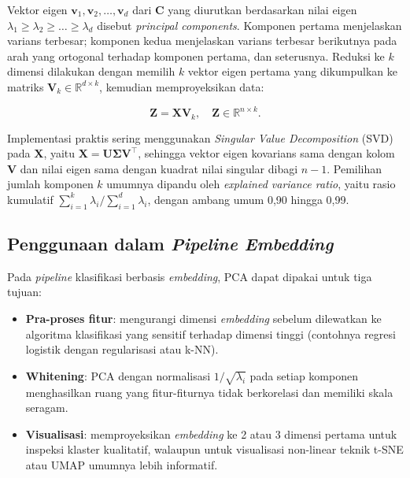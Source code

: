 Vektor eigen $\mathbf{v}_1, \mathbf{v}_2, \dots, \mathbf{v}_d$ dari $\mathbf{C}$ yang diurutkan berdasarkan nilai eigen $\lambda_1 \geq \lambda_2 \geq \dots \geq \lambda_d$ disebut \textit{principal components}. Komponen pertama menjelaskan varians terbesar; komponen kedua menjelaskan varians terbesar berikutnya pada arah yang ortogonal terhadap komponen pertama, dan seterusnya. Reduksi ke $k$ dimensi dilakukan dengan memilih $k$ vektor eigen pertama yang dikumpulkan ke matriks $\mathbf{V}_k \in \mathbb{R}^{d \times k}$, kemudian memproyeksikan data:

\begin{equation}
    \mathbf{Z} = \mathbf{X} \mathbf{V}_k, \quad \mathbf{Z} \in \mathbb{R}^{n \times k}.
    \label{eq:pca_proj}
\end{equation}

Implementasi praktis sering menggunakan \textit{Singular Value Decomposition} (SVD) pada $\mathbf{X}$, yaitu $\mathbf{X} = \mathbf{U} \boldsymbol{\Sigma} \mathbf{V}^\top$, sehingga vektor eigen kovarians sama dengan kolom $\mathbf{V}$ dan nilai eigen sama dengan kuadrat nilai singular dibagi $n-1$. Pemilihan jumlah komponen $k$ umumnya dipandu oleh \textit{explained variance ratio}, yaitu rasio kumulatif $\sum_{i=1}^{k} \lambda_i / \sum_{i=1}^{d} \lambda_i$, dengan ambang umum 0,90 hingga 0,99.

\subsection{Penggunaan dalam \textit{Pipeline Embedding}}

Pada \textit{pipeline} klasifikasi berbasis \textit{embedding}, PCA dapat dipakai untuk tiga tujuan:

\begin{itemize}
    \item \textbf{Pra-proses fitur}: mengurangi dimensi \textit{embedding} sebelum dilewatkan ke algoritma klasifikasi yang sensitif terhadap dimensi tinggi (contohnya regresi logistik dengan regularisasi atau k-NN).
    \item \textbf{Whitening}: PCA dengan normalisasi $1 / \sqrt{\lambda_i}$ pada setiap komponen menghasilkan ruang yang fitur-fiturnya tidak berkorelasi dan memiliki skala seragam.
    \item \textbf{Visualisasi}: memproyeksikan \textit{embedding} ke 2 atau 3 dimensi pertama untuk inspeksi klaster kualitatif, walaupun untuk visualisasi non-linear teknik t-SNE atau UMAP umumnya lebih informatif.
\end{itemize}

